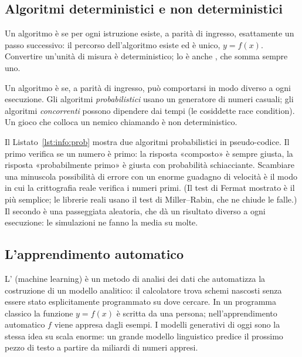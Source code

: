 \subsection{Algoritmi deterministici e non deterministici}

Un algoritmo è  se per ogni istruzione esiste, a parità di
ingresso, esattamente un passo successivo: il percorso dell'algoritmo esiste ed
è unico, $y=f(x)$. Convertire un'unità di misura è deterministico; lo è anche
, che somma sempre uno.

Un algoritmo è  se, a parità di ingresso, può
comportarsi in modo diverso a ogni esecuzione. Gli algoritmi
\emph{probabilistici} usano un generatore di numeri casuali; gli algoritmi
\emph{concorrenti} possono dipendere dai tempi (le cosiddette race condition).
Un gioco che colloca un nemico chiamando  è non
deterministico.

Il Listato~\ref{lst:info:prob} mostra due algoritmi probabilistici in
pseudo-codice. Il primo verifica se un numero è primo: la risposta «composto» è
sempre giusta, la risposta «probabilmente primo» è giusta con probabilità
schiacciante. Scambiare una minuscola possibilità di errore con un enorme
guadagno di velocità è il modo in cui la crittografia reale verifica i numeri
primi. (Il test di Fermat mostrato è il più semplice; le librerie reali usano
il test di Miller--Rabin, che ne chiude le falle.) Il secondo è una passeggiata
aleatoria, che dà un risultato diverso a ogni esecuzione: le simulazioni ne
fanno la media su molte.


\subsection{L'apprendimento automatico}

L' (machine learning) è un metodo di analisi dei
dati che automatizza la costruzione di un modello analitico: il calcolatore
trova schemi nascosti senza essere stato esplicitamente programmato su dove
cercare. In un programma classico la funzione $y=f(x)$ è scritta da una
persona; nell'apprendimento automatico $f$ viene appresa dagli esempi. I
modelli generativi di oggi sono la stessa idea su scala enorme: un grande
modello linguistico predice il prossimo pezzo di testo a partire da miliardi di
numeri appresi.

